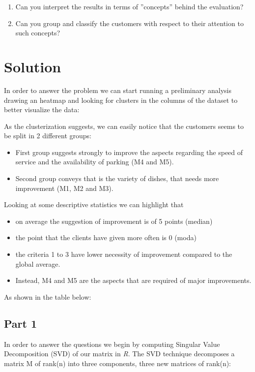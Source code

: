 \documentclass[10pt]{article}
\theoremstyle{plain}
\theoremstyle{definition}
\begin{document}
\begin{enumerate}

\item Can you interpret the results in terms of ”concepts” behind the evaluation? 
\item Can you group and classify the customers with respect to their attention to such concepts?

\end{enumerate}



\section{Solution}
In order to answer the problem we can start running a preliminary analysis drawing an heatmap and looking for clusters in the columns of the dataset to better visualize the data: 

As the clusterization suggests, we can easily notice that the customers seems to be split in 2 different groups:

\begin{itemize}

\item First group suggests strongly to improve the aspects regarding the speed of service and the availability of parking (M4 and M5).


\item Second group conveys that is the variety of dishes, that needs more improvement (M1, M2 and M3).

\end{itemize} 
Looking at some descriptive statistics we can highlight that
\begin{itemize}
    \item on average the suggestion of improvement is of 5 points (median) 
    \item the point that the clients have given more often is 0 (moda)
    \item the criteria 1 to 3 have lower necessity of improvement compared to the global average. 
    \item Instead, M4 and M5 are the aspects that are required of major improvements. 
\end{itemize}

As shown in the table below:
\newpage
\subsection{Part 1}
In order to answer the questions we begin by computing Singular Value Decomposition (SVD) of our matrix in \textit{R}. 
The SVD technique decomposes a matrix M of rank(n) into three components, three new matrices of rank(n):
\end{document}
